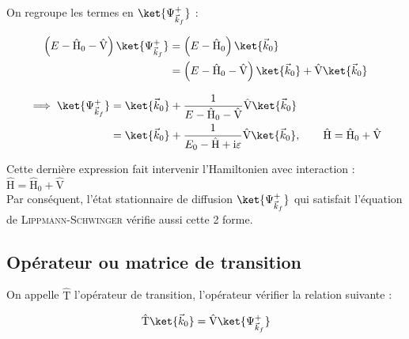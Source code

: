 \documentclass[12pt,a4paper,oneside,french]{book}
\renewcommand{\i}{\mathrm{i}}
\newcommand{\opr}[1]{\mathrm{\hat{#1}}}
\theoremstyle{definition}
\theoremstyle{definition}
\theoremstyle{definition}
\theoremstyle{remark}
\theoremstyle{definition}
\begin{document}
    On regroupe les termes en $\ket{{\Psi}_{{\vec{k}}_{f}}^{+}}$ :
    
    \begin{equation*}
    \begin{split}
        \left(E - {\opr{H}}_{0} - \opr{V}\right) \ket{{\Psi}_{{\vec{k}}_{f}}^{+}} 
            &= \left(E - {\opr{H}}_{0}\right) \ket{{\vec{k}}_{0} \vphantom{{\Psi}_{{\vec{k}}_{f}}^{+}}} \\
            &= \left(E - {\opr{H}}_{0} - \opr{V}\right) \ket{{\vec{k}}_{0} \vphantom{{\Psi}_{{\vec{k}}_{f}}^{+}}} + \opr{V} \ket{{\vec{k}}_{0} \vphantom{{\Psi}_{{\vec{k}}_{f}}^{+}}}
    \end{split}
    \end{equation*}
    
    \begin{equation*}
    \begin{split}
        \implies \ket{{\Psi}_{{\vec{k}}_{f}}^{+}}
            &= \ket{{\vec{k}}_{0} \vphantom{{\Psi}_{{\vec{k}}_{f}}^{+}}} + \frac{1}{E - {\opr{H}}_{0} - \opr{V}} \opr{V} \ket{{\vec{k}}_{0} \vphantom{{\Psi}_{{\vec{k}}_{f}}^{+}}} \\
            &= \ket{{\vec{k}}_{0} \vphantom{{\Psi}_{{\vec{k}}_{f}}^{+}}} + \frac{1}{{E}_{0} - \opr{H} + \i \varepsilon} \opr{V} \ket{{\vec{k}}_{0} \vphantom{{\Psi}_{{\vec{k}}_{f}}^{+}}}, \qquad \opr{H} = {\opr{H}}_{0} + \opr{V}
    \end{split}
    \end{equation*}
    
    Cette dernière expression fait intervenir l'Hamiltonien avec interaction : $\opr{H} = {\opr{H}}_{0} + \opr{V}$ \\
    
    Par conséquent, l'état stationnaire de diffusion $\ket{{\Psi}_{{\vec{k}}_{f}}^{+}}$ qui satisfait l'équation de \textsc{Lippmann-Schwinger} vérifie aussi cette 2 forme.
    
    \subsection{Opérateur ou matrice de transition}
    On appelle $\opr{T}$ l'opérateur de transition, l'opérateur vérifier la relation suivante :
    
    \begin{equation*}
        \opr{T} \ket{{\vec{k}}_{0} \vphantom{{\Psi}_{{\vec{k}}_{f}}^{+}}} = \opr{V} \ket{{\Psi}_{{\vec{k}}_{f}}^{+}}
    \end{equation*}
    
\end{document}
